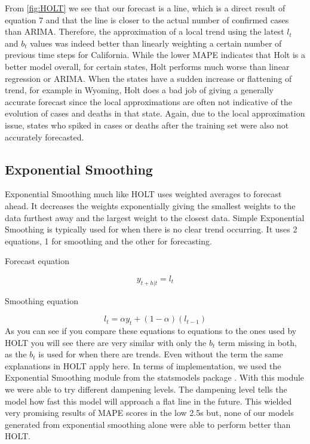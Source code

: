 \documentclass[sigconf,nonacm]{acmart}
\begin{document}
From \ref{fig:HOLT} we see that our forecast is a line, which is a direct
result of equation 7 and that the line is closer to the actual number of
confirmed cases than ARIMA. Therefore, the approximation of a local trend using
the latest $l_t$ and $b_t$ values was indeed better than linearly weighting a
certain number of previous time steps for California. While the lower MAPE
indicates that Holt is a better model overall, for certain states, Holt
performs much worse than linear regression or ARIMA. When the states have a
sudden increase or flattening of trend, for example in Wyoming, Holt does a bad
job of giving a generally accurate forecast since the local approximations are
often not indicative of the evolution of cases and deaths in that state. Again,
due to the local approximation issue, states who spiked in cases or deaths
after the training set were also not accurately forecasted.

\subsection{Exponential Smoothing}

Exponential Smoothing much like HOLT uses weighted averages to forecast ahead.
It decreases the weights exponentially giving the smallest weights to the data
furthest away and the largest weight to the closest data. Simple Exponential
Smoothing is typically used for when there is no clear trend occurring. It uses
2 equations, 1 for smoothing and the other for forecasting.

\begin{center}
    Forecast equation
\end{center}
\begin{equation}
   y_{t+h|t} = l_t
\end{equation}
 \begin{center}
    Smoothing equation
\end{center}
\begin{equation}
l_t = \alpha y_t + (1 - \alpha)(l_{t-1})
\end{equation}
As you can see if you compare these equations to equations to the
ones used by HOLT you will see there are very similar with only
the $b_t$ term missing in both, as the $b_t$ is used for when
there are trends. Even without the term the same explanations in
HOLT apply here. In terms of implementation, we used the Exponential Smoothing
module from the statsmodels
package \cite{statsmodels}. With this module we were able to try different
dampening levels. The dampening level tells the model how fast this model will
approach a flat line in the future. This wielded very promising results of MAPE
scores in the low 2.5s but, none of our models generated from exponential
smoothing alone were able to perform better than HOLT.
\end{document}
